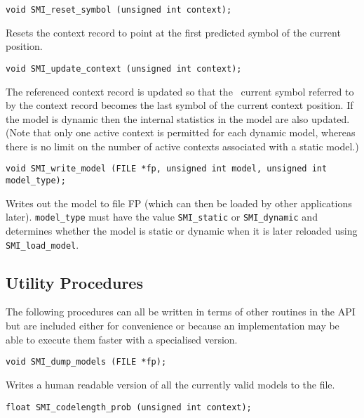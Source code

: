 \documentclass[11pt]{article}
\begin{document}
{\begin{verbatim}
void SMI_reset_symbol (unsigned int context);
\end{verbatim}

\vspace{-0.2cm}
Resets the context record to point at the first predicted symbol of the
current position.

\begin{verbatim}
void SMI_update_context (unsigned int context);
\end{verbatim}

\vspace{-0.2cm}
The referenced context record is updated so that the \ current symbol
referred to by the context record becomes the last symbol of the current
context position. If the model is dynamic then the internal statistics in
the model are also updated. (Note that only one active context is permitted
for each dynamic model, whereas there is no limit on the number of active
contexts associated with a static model.)


\begin{verbatim}
void SMI_write_model (FILE *fp, unsigned int model, unsigned int model_type);
\end{verbatim}

\vspace{-0.2cm}
Writes out the model to file FP (which can then be loaded
by other applications later). \verb|model_type| must have the value
\verb|SMI_static| or \verb|SMI_dynamic| and determines whether the
model is static or dynamic when it is later reloaded using
\verb|SMI_load_model|.

\subsection{Utility Procedures}

The following procedures can all be written in terms of other routines in
the API but are included either for convenience or because an implementation
may be able to execute them faster with a specialised version.

\begin{verbatim}
void SMI_dump_models (FILE *fp);
\end{verbatim}

\vspace{-0.2cm}
Writes a human readable version of all the currently valid models to the
file.

\begin{verbatim}
float SMI_codelength_prob (unsigned int context);
\end{verbatim}

}
\end{document}
